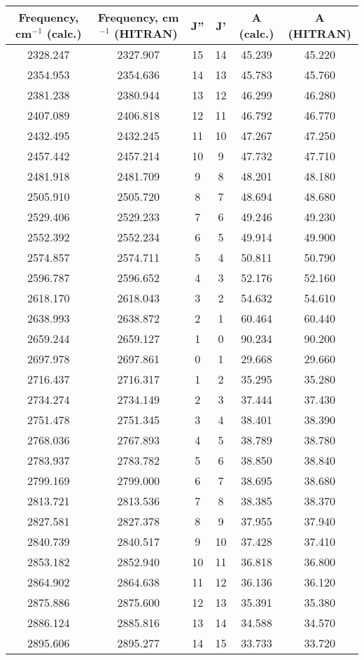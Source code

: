 \documentclass[14pt]{article}
\begin{document}
\setlength{\tabcolsep}{12pt}

\begin{center}

\begin{tabular}{cccccc}
\hline
\hline\noalign{\smallskip}
Frequency, cm$^{-1}$ (calc.) & Frequency, cm$^{-1}$ (HITRAN) & J'' & J' & A (calc.) & A (HITRAN) \\
\hline\noalign{\smallskip}
2328.247 & 2327.907 & 15 & 14 & 45.239 & 45.220 \\ 
2354.953 & 2354.636 & 14 & 13 & 45.783 & 45.760 \\ 
2381.238 & 2380.944 & 13 & 12 & 46.299 & 46.280 \\ 
2407.089 & 2406.818 & 12 & 11 & 46.792 & 46.770 \\ 
2432.495 & 2432.245 & 11 & 10 & 47.267 & 47.250 \\ 
2457.442 & 2457.214 & 10 & 9 & 47.732 & 47.710 \\ 
2481.918 & 2481.709 & 9 & 8 & 48.201 & 48.180 \\ 
2505.910 & 2505.720 & 8 & 7 & 48.694 & 48.680 \\ 
2529.406 & 2529.233 & 7 & 6 & 49.246 & 49.230 \\ 
2552.392 & 2552.234 & 6 & 5 & 49.914 & 49.900 \\ 
2574.857 & 2574.711 & 5 & 4 & 50.811 & 50.790 \\ 
2596.787 & 2596.652 & 4 & 3 & 52.176 & 52.160 \\ 
2618.170 & 2618.043 & 3 & 2 & 54.632 & 54.610 \\ 
2638.993 & 2638.872 & 2 & 1 & 60.464 & 60.440 \\ 
2659.244 & 2659.127 & 1 & 0 & 90.234 & 90.200 \\ 
2697.978 & 2697.861 & 0 & 1 & 29.668 & 29.660 \\ 
2716.437 & 2716.317 & 1 & 2 & 35.295 & 35.280 \\ 
2734.274 & 2734.149 & 2 & 3 & 37.444 & 37.430 \\ 
2751.478 & 2751.345 & 3 & 4 & 38.401 & 38.390 \\ 
2768.036 & 2767.893 & 4 & 5 & 38.789 & 38.780 \\ 
2783.937 & 2783.782 & 5 & 6 & 38.850 & 38.840 \\ 
2799.169 & 2799.000 & 6 & 7 & 38.695 & 38.680 \\ 
2813.721 & 2813.536 & 7 & 8 & 38.385 & 38.370 \\ 
2827.581 & 2827.378 & 8 & 9 & 37.955 & 37.940 \\ 
2840.739 & 2840.517 & 9 & 10 & 37.428 & 37.410 \\ 
2853.182 & 2852.940 & 10 & 11 & 36.818 & 36.800 \\ 
2864.902 & 2864.638 & 11 & 12 & 36.136 & 36.120 \\ 
2875.886 & 2875.600 & 12 & 13 & 35.391 & 35.380 \\ 
2886.124 & 2885.816 & 13 & 14 & 34.588 & 34.570 \\ 
2895.606 & 2895.277 & 14 & 15 & 33.733 & 33.720 \\
\hline
\end{tabular}

\end{center}
\end{document}
